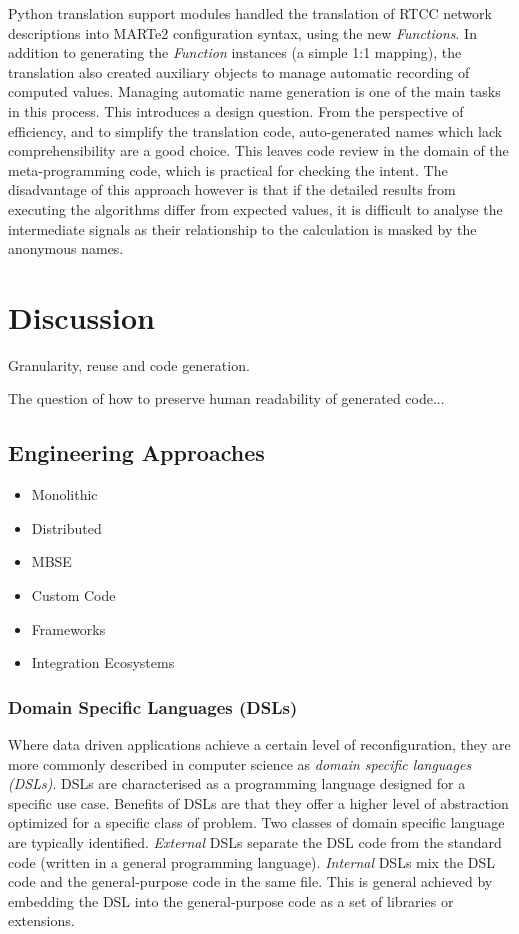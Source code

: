 \documentclass[preprint,12pt]{elsarticle}
\begin{document}
Python translation support modules handled the translation of RTCC network 
descriptions into MARTe2 configuration syntax, using the new {\em Functions}.
In addition to generating the {\em Function} instances (a simple 1:1 mapping),
the translation also created auxiliary objects to manage automatic
recording of computed values.  Managing automatic name generation is one
of the main tasks in this process.  This introduces a design question.  From
the perspective of efficiency, and to simplify the translation code, 
auto-generated names which lack comprehensibility are a good choice. 
This leaves code review in the domain of the meta-programming code, 
which is practical for checking the intent.  The disadvantage of this
approach however is that if the detailed results from executing the 
algorithms differ from expected values, it is difficult to analyse
the intermediate signals as their relationship to the calculation is
masked by the anonymous names.


\section{Discussion}

Granularity, reuse and code generation.

The question of how to preserve human readability of generated code...

\subsection{Engineering Approaches}

\begin{itemize}
\item{Monolithic}
\item{Distributed}
\item{MBSE}
\item{Custom Code}
\item{Frameworks}
\item{Integration Ecosystems}
\end{itemize}

\subsubsection{Domain Specific Languages (DSLs)}

Where data driven applications achieve a certain level of reconfiguration, they are more commonly
described in computer science as {\em domain specific languages (DSLs)}. DSLs are characterised
as a programming language designed for a specific use case.  Benefits of DSLs are that they 
offer a higher level of abstraction optimized for a specific class of problem. Two classes
of domain specific language are typically identified. {\em External} DSLs separate the DSL
code from the standard code (written in a general programming language).  {\em Internal} DSLs
mix the DSL code and the general-purpose code in the same file.  This is general achieved by
embedding the DSL into the general-purpose code as a set of libraries or extensions.
\end{document}
